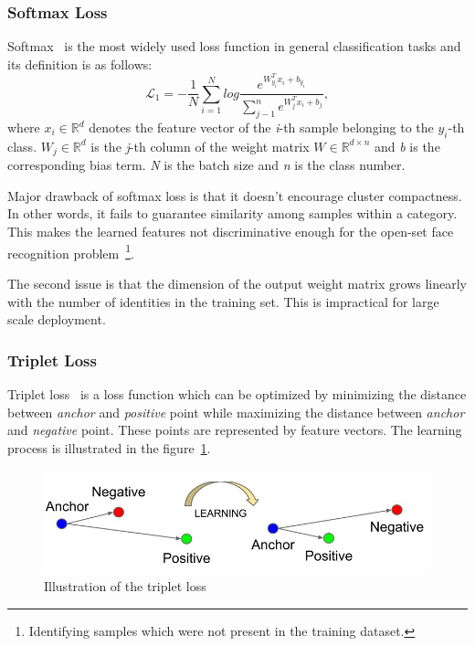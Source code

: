 \subsubsection{Softmax Loss}\label{subsubsec:softmax-loss}
Softmax~\cite{ArcFace} is the most widely used loss function in general classification tasks and its definition is as
follows:
\begin{equation}
    \label{eq:softmax}
    \mathcal{L}_1 = -\frac{1}{N} \sum_{i=1}^{N} log \frac{e^{W^T_{y_i} x_{i} + b_{y_i}}}
    {\sum_{j-1}^{n} e^{W^T_{j} x_{i} + b_{j}}},
\end{equation}
where $x_i \in \mathbb{R}^{d}$ denotes the feature vector of the \textit{i}-th sample belonging to the $y_i$-th class.
$W_j \in \mathbb{R}^{d}$ is the \textit{j}-th column of the weight matrix $W \in \mathbb{R}^{d \times n}$ and \textit{b}
is the corresponding bias term.
\textit{N} is the batch size and \textit{n} is the class number.

Major drawback of softmax loss is that it doesn't encourage cluster compactness.
In other words, it fails to guarantee similarity among samples within a category.
This makes the learned features not discriminative enough for the open-set face recognition
problem~\footnote{Identifying samples which were not present in the training dataset.}.

The second issue is that the dimension of the output weight matrix grows linearly with the number of identities in the
training set.
This is impractical for large scale deployment.

\subsubsection{Triplet Loss}\label{subsubsec:triplet-loss}
Triplet loss~\cite{TripletLoss} is a loss function which can be optimized by minimizing the distance between
\textit{anchor} and \textit{positive} point while maximizing the distance between \textit{anchor} and \textit{negative}
point.
These points are represented by feature vectors.
The learning process is illustrated in the figure~\ref{fig:tripletloss}.

\begin{figure}[H]
    \centering
    \includegraphics[width=\columnwidth]{images/face-recognition/tripletloss.jpeg}
    \caption{Illustration of the triplet loss~\cite{TripletLoss}}
    \label{fig:tripletloss}
\end{figure}

